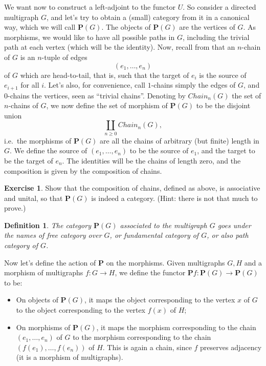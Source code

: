 \documentclass[12pt,oneside]{scrbook}
\numberwithin{equation}{section}
\theoremstyle{plain}
\newtheorem{deph}[thm]{Definition}
\theoremstyle{definition}
\newtheorem{ex}[thm]{Exercise}
\newcommand{\cat}[1]{{\mathbf{#1}}} %
\DeclareMathOperator{\1}{\mathbbm{1}}
\DeclareMathOperator{\2}{\mathbbm{2}}
\begin{document}
We want now to construct a left-adjoint to the functor $U$. So consider a directed multigraph $G$, and let's try to obtain a (small) category from it in a canonical way, which we will call $\cat{P}(G)$. The objects of $\cat{P}(G)$ are the vertices of $G$. As morphisms, we would like to have all possible paths in $G$, including the trivial path at each vertex (which will be the identity). Now, recall from  that an $n$-chain of $G$ is an $n$-tuple of edges 
$$
(e_1,\dots,e_n)
$$ 
of $G$ which are head-to-tail, that is, such that the target of $e_i$ is the source of $e_{i+1}$ for all $i$. Let's also, for convenience, call $1$-chains simply the edges of $G$, and $0$-chains the vertices, seen as ``trivial chains''. Denoting by $\mathit{Chain}_n(G)$ the set of $n$-chains of $G$, we now define the set of morphism of $\cat{P}(G)$ to be the disjoint union
$$
\coprod_{n\ge 0} \mathit{Chain}_n(G) ,
$$
i.e.~the morphisms of $\cat{P}(G)$ are all the chains of arbitrary (but finite) length in $G$. We define the source of $(e_1,\dots,e_n)$ to be the source of $e_1$, and the target to be the target of $e_n$. The identities will be the chains of length zero, and the composition is given by the composition of chains. 

\begin{ex}
 Show that the composition of chains, defined as above, is associative and unital, so that $\cat{P}(G)$ is indeed a category. (Hint: there is not that much to prove.)
\end{ex}

\begin{deph}
 The category $\cat{P}(G)$ associated to the multigraph $G$ goes under the names of \emph{free category over $G$}, or \emph{fundamental category of $G$}, or also \emph{path category of $G$}. 
\end{deph}


Now let's define the action of $\cat{P}$ on the morphisms. Given multigraphs $G,H$ and a morphism of multigraphs $f:G\to H$, we define the functor $\cat{P}f:\cat{P}(G)\to\cat{P}(G)$ to be:
\begin{itemize}
 \item On objects of $\cat{P}(G)$, it maps the object corresponding to the vertex $x$ of $G$ to the object corresponding to the vertex $f(x)$ of $H$;
 \item On morphisms of $\cat{P}(G)$, it maps the morphism corresponding to the chain $(e_1,\dots,e_n)$ of $G$ to the morphism corresponding to the chain $(f(e_1),\dots,f(e_n))$ of $H$. This is again a chain, since $f$ preserves adjacency (it is a morphism of multigraphs).
\end{itemize}
\end{document}
